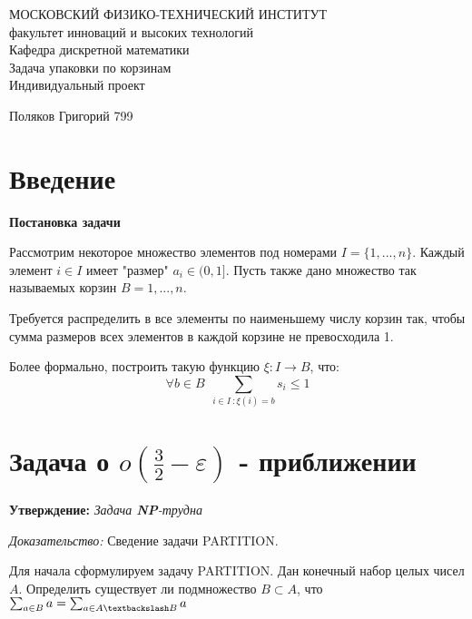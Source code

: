 \documentclass[a4paper,14pt,russian]{article}
\begin{document}
\begin{center}
\hfill \break
\large{МОСКОВСКИЙ ФИЗИКО-ТЕХНИЧЕСКИЙ ИНСТИТУТ}\\
\hfill \break
\normalsize{факультет инноваций и высоких технологий}\\
 \hfill \break
\normalsize{Кафедра дискретной математики}\\
\hfill\break
\hfill \break
\hfill \break
\hfill \break
\vfill
\Large{Задача упаковки по корзинам}\\
\hfill \break
\hfill \break
\large{Индивидуальный проект}

\hfill \break
\hfill \break

\end{center}
 
\hfill \break
\vfill

\hfill
\large{Поляков Григорий 799}
\break

\thispagestyle{empty} 
 
 
\newpage
     
    \tableofcontents
    
\newpage
 
\newpage
\section{Введение}

{\large \bf Постановка задачи}

Рассмотрим некоторое множество элементов под номерами $I = \{1, ..., n\}$. Каждый элемент $i \in I$ имеет "размер" $a_i \in (0, 1]$. Пусть также дано множество так называемых корзин $B = {1, ..., n}$. 

Требуется распределить в все элементы по наименьшему числу корзин так, чтобы сумма размеров всех элементов в каждой корзине не превосходила 1.

Более формально, построить такую функцию $\xi : I \rightarrow B$, что: $$\forall b \in B \:\: \sum_{i \in I \: : \xi(i) = b} s_i \leq 1$$

\newpage
\section {Задача о $o(\frac{3}{2} - \varepsilon)$ - приближении}

{\bf Утверждение:} \textit{Задача {\bf NP}-трудна}

\textit{Доказательство:} Сведение задачи PARTITION.

Для начала сформулируем задачу PARTITION. Дан конечный набор целых чисел $A$. Определить существует ли подмножество $B \subset A$, что $\sum_{a \in B} a = \sum_{a \in {A \textbackslash B}} a$
\end{document}

